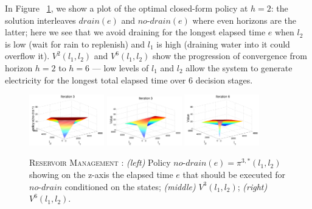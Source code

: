 \documentclass[twoside,11pt]{article}
\newcommand{\WaterReservoir}{\textsc{Reservoir Management }}
\begin{document}
In Figure ~\ref{fig:v2plots}, we show a plot of 
the optimal closed-form policy at $h=2$: the solution interleaves $\mathit{drain}(e)$ and $\mathit{no}$-$\mathit{drain}(e)$ where even horizons are the latter;
here we see that we avoid draining for the longest elapsed time $e$ 
when $l_2$ is low (wait for rain to replenish) and $l_1$ is high (draining
water into it could overflow it).  $V^2(l_1,l_2)$ and $V^6(l_1,l_2)$
show the progression of convergence from horizon $h=2$ to $h=6$ ---
low levels of $l_1$ and $l_2$ allow the system to generate electricity
for the longest total elapsed time over 6 decision stages. 
\begin{figure}[tbp!]
\vspace{-2mm}
\centering
\includegraphics[width=0.29\textwidth]{Figures2/camdp/q3.pdf}
\includegraphics[width=0.29\textwidth]{Figures2/camdp/v3.pdf}
\includegraphics[width=0.29\textwidth]{Figures2/camdp/v6.pdf}
\vspace{-3mm}
\caption{%
\WaterReservoir: 
{\it (left)} Policy $\mathit{no}$-$\mathit{drain}(e)=\pi^{3,*}(l_1,l_2)$ 
showing on the z-axis the elapsed time $e$ that should be executed 
for $\mathit{no}$-$\mathit{drain}$ conditioned on the states; 
{\it (middle)} $V^3(l_1,l_2)$; 
{\it (right)} $V^6(l_1,l_2)$.
}
\label{fig:v2plots}
\vspace{-4mm}
\end{figure}
\end{document}
